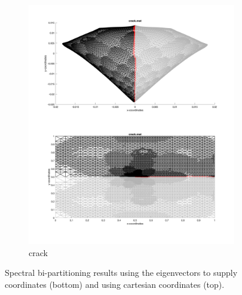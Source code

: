 \begin{figure}[H]
\begin{subfigure}{0.5\textwidth}
		\includegraphics[width=\textwidth]{./media/crack_eigen.png}
		\caption{crack}
		\label{fig:inert_crack}
	\end{subfigure}
	\caption{Spectral bi-partitioning results using the eigenvectors to supply coordinates (bottom) and using cartesian coordinates (top).}
	\label{fig:rec_bi}
\end{figure}

